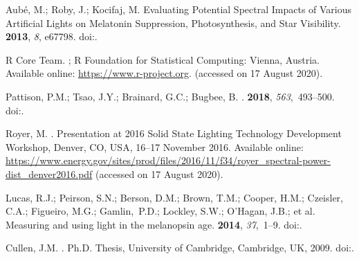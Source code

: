 \documentclass[energies,article,accept,moreauthors,pdftex]{Definitions/mdpi}\usepackage[]{graphicx}\usepackage[]{color}
\begin{document}
\begin{thebibliography}{999}
Aub{\'e}, M.; Roby, J.; Kocifaj, M.
\newblock Evaluating Potential Spectral Impacts of Various Artificial Lights on
  Melatonin Suppression, Photosynthesis, and Star Visibility.
 {\bf 2013}, {\em 8}, e67798.
\newblock
  doi:{\href{https://doi.org/10.1371/journal.pone.0067798}{}}.%









{R Core Team}.
;
\newblock R Foundation for Statistical Computing: Vienna, Austria.  Available online: 
  \url{https://www.r-project.org}.
\newblock (accessed on 17 August 2020).%

Pattison, P.M.; Tsao, J.Y.; Brainard, G.C.; Bugbee, B.
.
 {\bf 2018}, {\em 563},~493--500.
\newblock
  doi:{\href{https://doi.org/10.1038/s41586-018-0706-x}{}}.%

Royer, M.
.
\newblock Presentation at 2016 Solid State Lighting Technology Development
  Workshop,  Denver, CO, USA, 16--17 November 2016.  Available online:  
  \url{https://www.energy.gov/sites/prod/files/2016/11/f34/royer_spectral-power-dist_denver2016.pdf}
\newblock (accessed on 17 August 2020).%

Lucas, R.J.; Peirson, S.N.; Berson, D.M.; Brown, T.M.; Cooper, H.M.; Czeisler,
  C.A.; Figueiro, M.G.; \mbox{Gamlin, P.D.}; Lockley, S.W.; O'Hagan, J.B.; et al.
\newblock Measuring and using light in the melanopsin age.
 {\bf 2014}, {\em 37},~1--9.
\newblock
  doi:{\href{https://doi.org/10.1016/j.tins.2013.10.004}{}}.%

Cullen, J.M.
.
\newblock Ph.D. Thesis, University of Cambridge, Cambridge, UK,
  2009.
\newblock
  doi:{\href{https://doi.org/10.17863/CAM.13974}{}}.%


\end{thebibliography}
\end{document}
